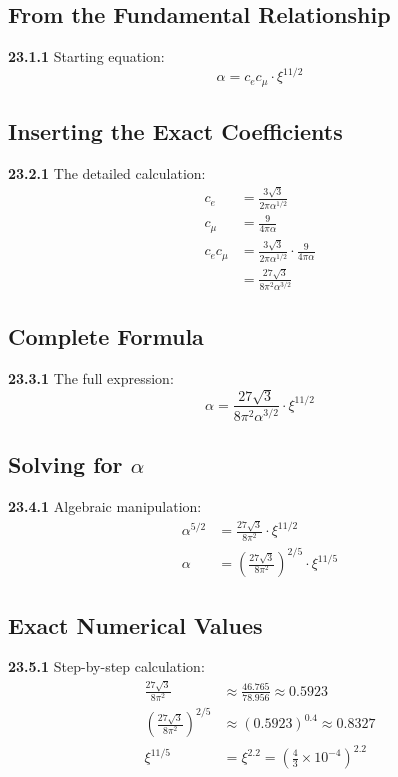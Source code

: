 \documentclass[12pt,a4paper]{article}
\begin{document}
\subsection{From the Fundamental Relationship}
\noindent \textbf{23.1.1} Starting equation:
\begin{equation}
	\alpha = c_e c_\mu \cdot \xi^{11/2}
\end{equation}

\subsection{Inserting the Exact Coefficients}
\noindent \textbf{23.2.1} The detailed calculation:
\begin{align}
	c_e &= \frac{3\sqrt{3}}{2\pi\alpha^{1/2}} \\
	c_\mu &= \frac{9}{4\pi\alpha} \\
	c_e c_\mu &= \frac{3\sqrt{3}}{2\pi\alpha^{1/2}} \cdot \frac{9}{4\pi\alpha} \\
	&= \frac{27\sqrt{3}}{8\pi^2\alpha^{3/2}}
\end{align}

\subsection{Complete Formula}
\noindent \textbf{23.3.1} The full expression:
\begin{equation}
	\alpha = \frac{27\sqrt{3}}{8\pi^2\alpha^{3/2}} \cdot \xi^{11/2}
\end{equation}

\subsection{Solving for $\alpha$}
\noindent \textbf{23.4.1} Algebraic manipulation:
\begin{align}
	\alpha^{5/2} &= \frac{27\sqrt{3}}{8\pi^2} \cdot \xi^{11/2} \\
	\alpha &= \left(\frac{27\sqrt{3}}{8\pi^2}\right)^{2/5} \cdot \xi^{11/5}
\end{align}

\subsection{Exact Numerical Values}
\noindent \textbf{23.5.1} Step-by-step calculation:
\begin{align}
	\frac{27\sqrt{3}}{8\pi^2} &\approx \frac{46.765}{78.956} \approx 0.5923 \\
	\left(\frac{27\sqrt{3}}{8\pi^2}\right)^{2/5} &\approx (0.5923)^{0.4} \approx 0.8327 \\
	\xi^{11/5} &= \xi^{2.2} = \left(\frac{4}{3} \times 10^{-4}\right)^{2.2}
\end{align}
\end{document}
